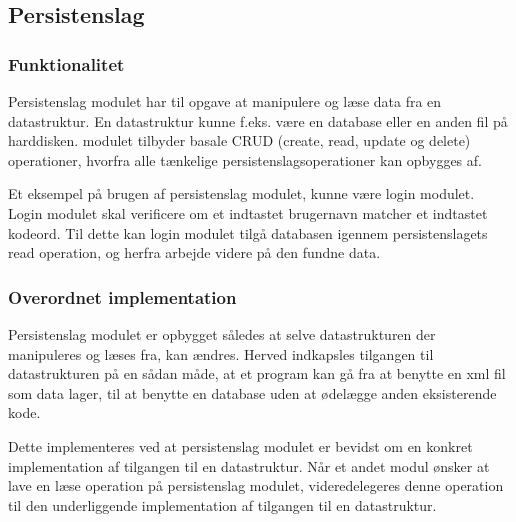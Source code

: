 \subsection{Persistenslag}
\label{sub:persistenslag}

\subsubsection{Funktionalitet}
\label{ssub:Funktionalitet}

Persistenslag modulet har til opgave at manipulere og læse data fra en datastruktur. En datastruktur kunne f.eks. være en database eller en anden fil på harddisken. modulet tilbyder basale CRUD (create, read, update og delete) operationer, hvorfra alle tænkelige persistenslagsoperationer kan opbygges af.

Et eksempel på brugen af persistenslag modulet, kunne være login modulet. Login modulet skal verificere om et indtastet brugernavn matcher et indtastet kodeord. Til dette kan login modulet tilgå databasen igennem persistenslagets read operation, og herfra arbejde videre på den fundne data.


\subsubsection{Overordnet implementation}
\label{ssub:Implementation}


Persistenslag modulet er opbygget således at selve datastrukturen der manipuleres og læses fra, kan ændres. Herved indkapsles tilgangen til datastrukturen på en sådan måde, at et program kan gå fra at benytte en xml fil som data lager, til at benytte en database uden at ødelægge anden eksisterende kode.

Dette implementeres ved at persistenslag modulet er bevidst om en konkret implementation af tilgangen til en datastruktur. Når et andet modul ønsker at lave en læse operation på persistenslag modulet, videredelegeres denne operation til den underliggende implementation af tilgangen til en datastruktur.
